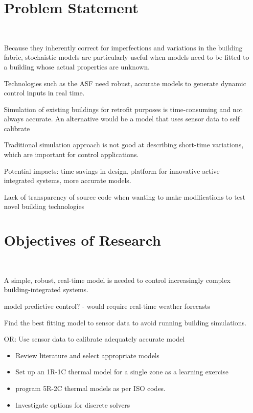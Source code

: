 \section{Problem Statement}\
\begin{flushleft}
Because they inherently correct for imperfections and variations in the building fabric, stochaistic models are particularly useful when models need to be fitted to a building whose actual properties are unknown. 

Technologies such as the ASF need robust, accurate models to generate dynamic control inputs in real time.
	\item Simulation of existing buildings for retrofit purposes is time-consuming and not always accurate. An alternative would be a model that uses sensor data to self calibrate
	\item Traditional simulation approach is not good at describing short-time variations, which are important for control applications.
	\item Potential impacts: time savings in design, platform for innovative active integrated systems, more accurate models.
	\item Lack of transparency of source code when wanting to make modifications to test novel building technologies



\section{Objectives of Research}\


	\item  A simple, robust, real-time model is needed to control increasingly complex building-integrated systems.
	\item 
		\item  model predictive control? - would require real-time weather forecasts

	\item  Find the best fitting model to sensor data to avoid running building simulations.

	\item  
		\item  OR: Use sensor data to calibrate adequately accurate model



\begin{itemize}
	\item Review literature and select appropriate models
	\item Set up an 1R-1C thermal model for a single zone as a learning exercise
	\item program 5R-2C thermal models as per ISO codes.
	\item Investigate options for discrete solvers
	

\end{itemize}
\end{flushleft}
